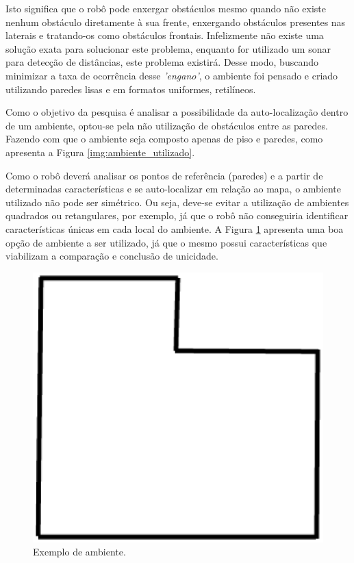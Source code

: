 	Isto significa que o robô pode enxergar obstáculos mesmo quando não existe nenhum obstáculo diretamente à sua frente, enxergando obstáculos presentes nas laterais e tratando-os como obstáculos frontais. Infelizmente não existe uma solução exata para solucionar este problema, enquanto for utilizado um sonar para detecção de distâncias, este problema existirá.
	Desse modo, buscando minimizar a taxa de ocorrência desse \textit{'engano'}, o ambiente foi pensado e criado utilizando paredes lisas e em formatos uniformes, retilíneos.

	Como o objetivo da pesquisa é analisar a possibilidade da auto-localização dentro de um ambiente, optou-se pela não utilização de obstáculos entre as paredes. Fazendo com que o ambiente seja composto apenas de piso e paredes, como apresenta a Figura \ref{img:ambiente_utilizado}.

	Como o robô deverá analisar os pontos de referência (paredes) e a partir de determinadas características e se auto-localizar em relação ao mapa, o ambiente utilizado não pode ser simétrico. Ou seja, deve-se evitar a utilização de ambientes quadrados ou retangulares, por exemplo, já que o robô não conseguiria identificar características únicas em cada local do ambiente.
	A Figura \ref{img:exemplo_ambiente} apresenta uma boa opção de ambiente a ser utilizado, já que o mesmo possui características que viabilizam a comparação e conclusão de unicidade.

	\begin{figure}[H]
		\centering
		\includegraphics[scale=0.5]{figuras/exemplo_ambiente.eps}
		\caption[Exemplo de ambiente]{Exemplo de ambiente.}
		\label{img:exemplo_ambiente}
	\end{figure}

